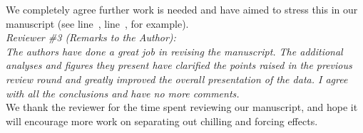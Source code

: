 \documentclass[11pt, a4paper]{article}
\newcommand{\lr}[1]{line~\lineref{#1}}
\begin{document}
We completely agree further work is needed and have aimed to stress this in our manuscript (see \lr{R2_1}, \lr{R2_2}, for example).\\

 \emph{Reviewer \#3 (Remarks to the Author):}\\

\emph{The authors have done a great job in revising the manuscript. The additional analyses and figures they present have clarified the points raised in the previous review round and greatly improved the overall presentation of the data. I agree with all the conclusions and have no more comments.}\\

We thank the reviewer for the time spent reviewing our manuscript, and hope it will encourage more work on separating out chilling and forcing effects. \\


\end{document}
